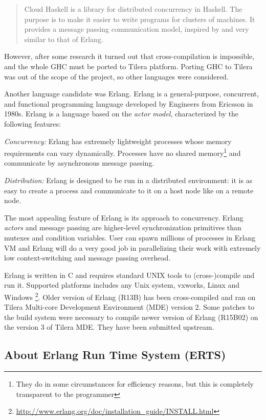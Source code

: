 \documentclass[english,11pt]{l4proj}
\begin{document}
\begin{quote}
    Cloud Haskell is a library for distributed concurrency in Haskell. The
    purpose is to make it easier to write programs for clusters of machines. It
    provides a message passing communication model, inspired by and very similar
    to that of Erlang.
\end{quote}

However, after some research it turned out that cross-compilation is impossible,
and the whole GHC must be ported to Tilera platform. Porting GHC to Tilera was
out of the scope of the project, so other languages were considered.

Another language candidate was Erlang. Erlang is a general-purpose, concurrent,
and functional programming language developed by Engineers from Ericsson in
1980s. Erlang is a language based on the  {\em actor model}, characterized by
the following features:

{\em Concurrency:} Erlang has extremely lightweight processes whose memory
requirements can vary dynamically. Processes have no shared
memory\footnote{They do in some circumstances for efficiency reasons, but this
is completely transparent to the programmer} and communicate by asynchronous
message passing.

{\em Distribution:} Erlang is designed to be run in a distributed
environment: it is as easy to create a process and communicate to
it on a host node like on a remote node.

The most appealing feature of Erlang is its approach to concurrency. Erlang {\em
actors} and message passing are higher-level synchronization primitives than
mutexes and condition variables. User can spawn millions of processes in Erlang
VM and Erlang will do a very good job in parallelizing their work with extremely
low context-switching and message passing overhead.

Erlang is written in C and requires standard UNIX tools to (cross-)compile and
run it. Supported platforms includes any Unix system, vxworks, Linux and
Windows
\footnote{\url{http://www.erlang.org/doc/installation\_guide/INSTALL.html}}.
Older version of Erlang (R13B) has been cross-compiled and ran on Tilera
Multi-core Development Environment (MDE) version 2. Some patches to the build
system were necessary to compile newer version of Erlang (R15B02) on the
version 3 of Tilera MDE. They have been submitted upstream.

\subsection{About Erlang Run Time System (ERTS)}
\end{document}
